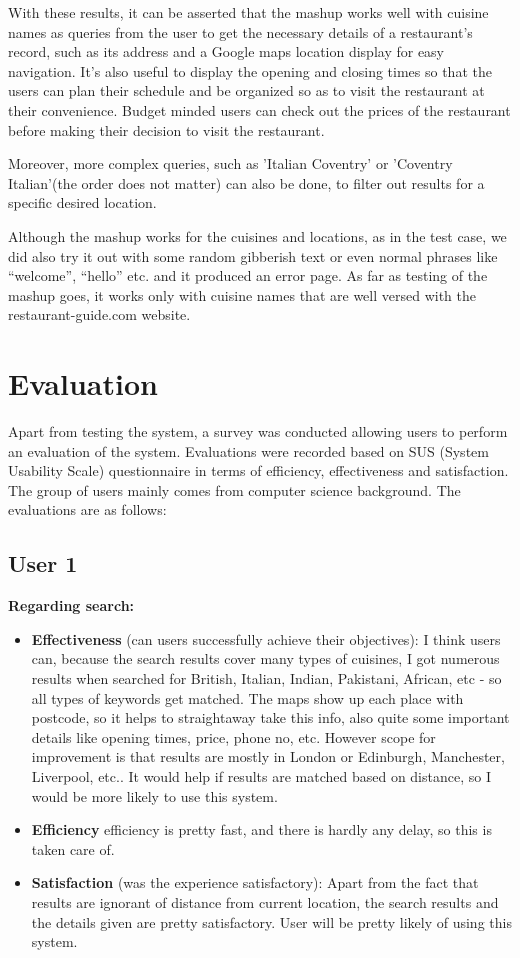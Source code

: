 With these results, it can be asserted that the mashup works well with cuisine names as queries from the user to get the necessary details of a restaurant's record, such as its address and a Google maps location display for easy navigation. It’s also useful to display the opening and closing times so that the users can plan their schedule and be organized so as to visit the restaurant at their convenience. Budget minded users can check out the prices of the restaurant before making their decision to visit the restaurant.

Moreover, more complex queries, such as 'Italian Coventry' or 'Coventry Italian'(the order does not matter) can also be done, to filter out results for a specific desired location.

Although the mashup works for the cuisines and locations, as in the test case, we did also try it out with some random gibberish text or even normal phrases like “welcome”, “hello” etc. and it produced an error page.
As far as testing of the mashup goes, it works only with cuisine names that are well versed with the restaurant-guide.com website.

\section{Evaluation}
Apart from testing the system, a survey was conducted allowing users to perform an evaluation of the system. Evaluations were recorded based on SUS (System Usability Scale) questionnaire \cite{20} in terms of efficiency, effectiveness and satisfaction. The group of users mainly comes from computer science background. The evaluations are as follows:

\subsection{User 1}
\textbf{Regarding search:}

\begin{itemize}

\item \textbf{Effectiveness} (can users successfully achieve their objectives): I think users can, because the search results cover many types of cuisines, I got numerous results when searched for British, Italian, Indian, Pakistani, African, etc - so all types of keywords get matched. The maps show up each place with postcode, so it helps to straightaway take this info, also quite some important details like opening times, price, phone no, etc. However scope for improvement is that results are mostly in London or Edinburgh, Manchester, Liverpool, etc.. It would help if results are matched based on distance, so I would be more likely to use this system.
\item \textbf{Efficiency} efficiency is pretty fast, and there is hardly any delay, so this is taken care of.
\item \textbf{Satisfaction} (was the experience satisfactory): Apart from the fact that results are ignorant of distance from current location, the search results and the details given are pretty satisfactory. User will be pretty likely of using this system.
  
\end{itemize}

